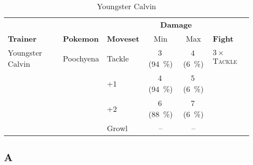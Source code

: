 \documentclass[11pt,a4paper,titlepage]{article}
\begin{document}
\begin{table}[htbp]
	\caption{Youngster Calvin}
	\centering
	\begin{tabular}{lllccl}
		\toprule 
		&&&\multicolumn{2}{c}{\textbf{Damage}}&\\
		\cmidrule(rl){4-5}
		\textbf{Trainer}&\textbf{Pokemon}&\textbf{Moveset}&Min&Max&\textbf{Fight}\\ 
		\midrule
		Youngster Calvin&Poochyena&Tackle&3\,(\SI{94}{\percent})&4\,(\SI{6}{\percent})&$3 \times$ \textsc{Tackle}\\
		&&+1&4\,(\SI{94}{\percent})&5\,(\SI{6}{\percent})&\\ 
		&&+2&6\,(\SI{88}{\percent})&7\,(\SI{6}{\percent})&\\
		&&Growl&--&--&\\
		\bottomrule
	\end{tabular}
\end{table}



\begin{appendix}
\section{A}
\end{appendix}
\end{document}

